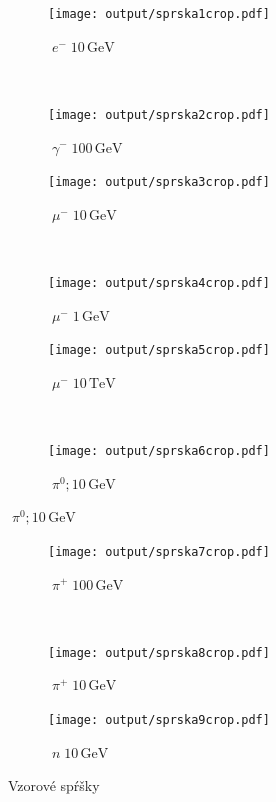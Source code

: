 \documentclass[a4paper, 10pt]{article}
\newcommand{\unit}[1]{\ensuremath{\, \mathrm{#1}}}
\begin{document}
\begin{figure}
        \centering
        \begin{subfigure}[b]{0.5\textwidth}
                \texttt{[image: output/sprska1crop.pdf]}
                \caption{$\;e^-\; 10\unit{GeV}$}
                \label{fig:s1}
        \end{subfigure}%
        ~ 
        \begin{subfigure}[b]{0.5\textwidth}
                \texttt{[image: output/sprska2crop.pdf]}
                \caption{$\;\gamma^-\; 100\unit{GeV}$}
                \label{fig:s2}
        \end{subfigure}
        \begin{subfigure}[b]{0.5\textwidth}
                \texttt{[image: output/sprska3crop.pdf]}
                \caption{$\;\mu^-\; 10\unit{GeV}$}
                \label{fig:s3}
        \end{subfigure}%
        ~ 
        \begin{subfigure}[b]{0.5\textwidth}
                \texttt{[image: output/sprska4crop.pdf]}
                \caption{$\;\mu^-\; 1\unit{GeV}$}
                \label{fig:s4}
        \end{subfigure}
        \begin{subfigure}[b]{0.5\textwidth}
                \texttt{[image: output/sprska5crop.pdf]}
                \caption{$\;\mu^-\; 10\unit{TeV}$}
                \label{fig:s5}
        \end{subfigure}%
        ~ 
        \begin{subfigure}[b]{0.5\textwidth}
                \texttt{[image: output/sprska6crop.pdf]}
                \caption{$\;\pi^0; 10\unit{GeV}$}
                \label{fig:s6}
        \end{subfigure}
\end{figure}

\begin{figure}
\ContinuedFloat
        
        \begin{subfigure}[b]{0.5\textwidth}
                \texttt{[image: output/sprska7crop.pdf]}
                \caption{$\;\pi^+\; 100\unit{GeV}$}
                \label{fig:s7}
        \end{subfigure}%
        ~ 
        \begin{subfigure}[b]{0.5\textwidth}
                \texttt{[image: output/sprska8crop.pdf]}
                \caption{$\;\pi^+\; 10\unit{GeV}$}
                \label{fig:s8}
        \end{subfigure}
        
        \begin{subfigure}[b]{0.5\textwidth}
                \texttt{[image: output/sprska9crop.pdf]}
                \caption{$\;n\; 10\unit{GeV}$}
                \label{fig:s9}
        \end{subfigure}
        \caption{Vzorové spŕšky}\label{fig:sprsky}
\end{figure}
\end{document}
